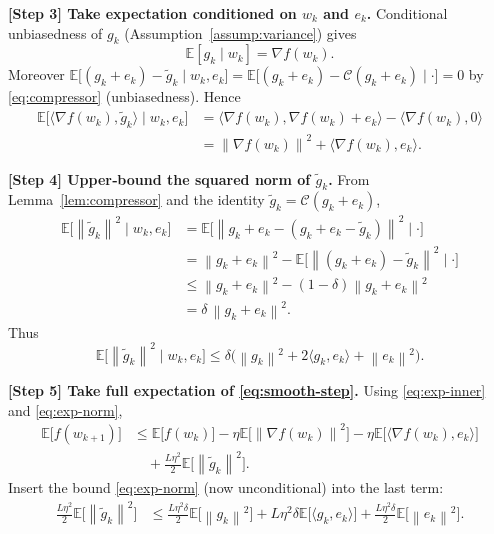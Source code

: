 \documentclass{article}
\newcommand{\E}{\mathbb{E}}
\newcommand{\norm}[1]{\left\|#1\right\|}
\newcommand{\inner}[2]{\langle #1,#2\rangle}
\begin{document}
\noindent\textbf{[Step 3] Take expectation conditioned on $w_k$ and $e_k$.}  
Conditional unbiasedness of $g_k$ (Assumption~\ref{assump:variance}) gives
\[
    \E[g_k\mid w_k]=\nabla f(w_k).
\]
Moreover $\E\big[(g_k+e_k)-\tilde g_k\mid w_k,e_k\big]=\E\big[(g_k+e_k)-\mathcal{C}(g_k+e_k)\mid\cdot\big]=0$ by \eqref{eq:compressor} (unbiasedness). Hence
\begin{align}
    \E\!\big[\inner{\nabla f(w_k)}{\tilde g_k}\mid w_k,e_k\big]
    &= \inner{\nabla f(w_k)}{\nabla f(w_k)+e_k}
       - \inner{\nabla f(w_k)}{0} \nonumber\\
    &= \norm{\nabla f(w_k)}^2 + \inner{\nabla f(w_k)}{e_k}.
    \label{eq:exp-inner}
\end{align}

\noindent\textbf{[Step 4] Upper‑bound the squared norm of $\tilde g_k$.}  
From Lemma~\ref{lem:compressor} and the identity $\tilde g_k=\mathcal{C}(g_k+e_k)$,
\begin{align}
    \E\!\big[\norm{\tilde g_k}^2\mid w_k,e_k\big]
    &= \E\!\big[\norm{g_k+e_k-(g_k+e_k-\tilde g_k)}^2\mid\cdot\big] \nonumber\\
    &= \norm{g_k+e_k}^2 - \E\!\big[\norm{(g_k+e_k)-\tilde g_k}^2\mid\cdot\big] \nonumber\\
    &\le \norm{g_k+e_k}^2 - (1-\delta)\norm{g_k+e_k}^2 \nonumber\\
    &= \delta\,\norm{g_k+e_k}^2 .
    \label{eq:exp-norm}
\end{align}
Thus
\[
    \E\!\big[\norm{\tilde g_k}^2\mid w_k,e_k\big]\le \delta\Big(\norm{g_k}^2+2\inner{g_k}{e_k}+\norm{e_k}^2\Big).
\]

\noindent\textbf{[Step 5] Take full expectation of \eqref{eq:smooth-step}.}  
Using \eqref{eq:exp-inner} and \eqref{eq:exp-norm},
\begin{align}
    \E\!\big[f(w_{k+1})\big]
    &\le \E\!\big[f(w_k)\big]
       -\eta\E\!\big[\norm{\nabla f(w_k)}^2\big]
       -\eta\E\!\big[\inner{\nabla f(w_k)}{e_k}\big] \nonumber\\
    &\quad +\frac{L\eta^2}{2}\E\!\big[\norm{\tilde g_k}^2\big] .
    \label{eq:exp-smooth}
\end{align}
Insert the bound \eqref{eq:exp-norm} (now unconditional) into the last term:
\begin{align}
    \frac{L\eta^2}{2}\E\!\big[\norm{\tilde g_k}^2\big]
    &\le \frac{L\eta^2\delta}{2}\E\!\big[\norm{g_k}^2\big]
       +L\eta^2\delta\E\!\big[\inner{g_k}{e_k}\big]
       +\frac{L\eta^2\delta}{2}\E\!\big[\norm{e_k}^2\big].
    \label{eq:bound-last}
\end{align}
\end{document}
